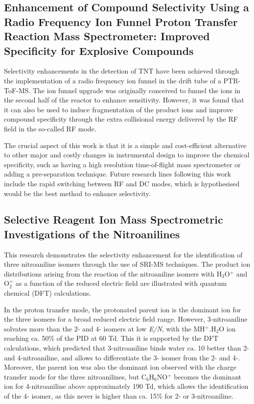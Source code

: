 
\subsection{Enhancement of Compound Selectivity Using a Radio Frequency Ion Funnel Proton Transfer Reaction Mass Spectrometer: Improved Specificity for Explosive Compounds}

Selectivity enhancements in the detection of TNT have been achieved through the implementation of a radio frequency ion funnel in the drift tube of a PTR-ToF-MS.
%
The ion funnel upgrade was originally conceived to funnel the ions in the second half of the reactor to enhance sensitivity.
%
However, it was found that it can also be used to induce fragmentation of the product ions and improve compound specificity through the extra collisional energy delivered by the RF field in the so-called RF mode.


The crucial aspect of this work is that it is a simple and cost-efficient alternative to other major and costly changes in instrumental design to improve the chemical specificity, such as having a high resolution time-of-flight mass spectrometer or adding a pre-separation technique.
%
Future research lines following this work include the rapid switching between RF and DC modes, which is hypothesised would be the best method to enhance selectivity.



\subsection{Selective Reagent Ion Mass Spectrometric Investigations of the Nitroanilines}

This research demonstrates the selectivity enhancement for the identification of three nitroaniline isomers through the use of SRI-MS techniques.
%
The product ion distributions arising from the reaction of the nitroaniline isomers with H$_3$O$^+$ and O$_2^+$ as a function of the reduced electric field are illustrated with quantum chemical  (DFT) calculations.

In the proton transfer mode, the protonated parent ion is the dominant ion for the three isomers for a broad reduced electric field range.
%
However, 3-nitroaniline solvates more than the 2- and 4- isomers at low \textit{E/N}, with the MH$^+$.H$_2$O ion reaching ca. 50\% of the PID at 60 Td.
%
This it is supported by the DFT calculations, which predicted that 3-nitroaniline binds water ca. 10 better than 2- and 4-nitroaniline, and allows to differentiate the 3- isomer from the 2- and 4-.
%
Moreover, the parent ion was also the dominant ion observed with the charge transfer mode for the three nitroanilines, but C$_6$H$_6$NO$^+$ becomes the dominant ion for 4-nitroaniline above approximately 190 Td, which allows the identification of the 4- isomer, as this never is higher than ca. 15\% for 2- or 3-nitroaniline.


